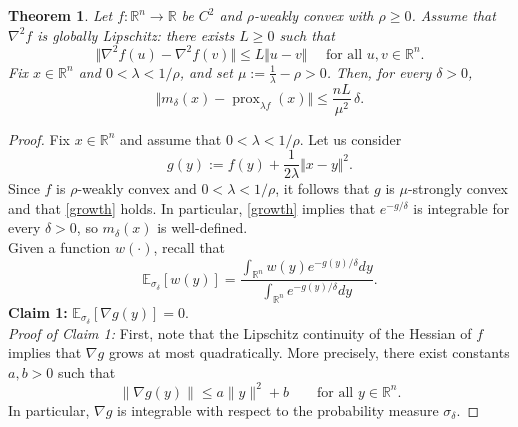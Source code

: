 \documentclass[11pt]{amsart}
\newcommand{\1}{\mathds{1}}
\newtheorem{theorem}{Theorem}[section]
\theoremstyle{definition}
\theoremstyle{remark}
\theoremstyle{definition}
\begin{document}
\begin{theorem}
Let $f\colon \mathbb{R}^n \to \mathbb{R}$ be $C^2$ and $\rho$-weakly convex with $\rho\geq 0$.  Assume that $\nabla^2 f$ is globally Lipschitz: there exists $L\geq 0$ such that
$$
\Vert \nabla^2 f(u)-\nabla^2 f(v)\Vert \leq L\Vert u-v\Vert \quad \textrm{ for all } u,v\in \mathbb{R}^n.
$$
Fix $x\in \mathbb{R}^n$ and $0<\lambda <1/\rho$, and set $\mu:=\frac{1}{\lambda}-\rho>0$. 
Then, for every $\delta>0$,
$$
\Vert m_{\delta}(x)-\operatorname{prox}_{\lambda f}(x)\Vert \leq \frac{nL}{\mu^2}\,\delta.
$$
\end{theorem}
\begin{proof} Fix $x\in \mathbb{R}^n$ and assume that $0<\lambda <1/\rho$. Let us consider 
\begin{equation*}
g(y):=f(y)+\frac{1}{2\lambda}\Vert x-y\Vert^2.
\end{equation*}
Since $f$ is $\rho$-weakly convex and $0<\lambda <1/\rho$, it follows that $g$ is $\mu$-strongly convex and that \eqref{growth} holds. In particular, \eqref{growth} implies that $e^{-g/\delta}$ is integrable for every $\delta>0$, so $m_{\delta}(x)$ is well-defined. \\
Given a function $w(\cdot)$, recall that
$$
\mathbb{E}_{\sigma_{\delta}}[w(y)]=\frac{\int_{\mathbb{R}^n} w(y)e^{-g(y)/\delta}dy}{\int_{\mathbb{R}^n}e^{-g(y)/\delta}dy}.
$$
\textbf{Claim 1:} $\mathbb{E}_{\sigma_{\delta}}[ \nabla g(y)]=0$.\\
\emph{Proof of Claim 1:} First, note that the Lipschitz continuity of the Hessian of $f$ implies that $\nabla g$ grows at most quadratically. More precisely, there exist constants $a,b>0$ such that
\[
\|\nabla g(y)\|\le a\|y\|^{2}+b \qquad \text{for all } y\in\mathbb{R}^{n}.
\]
In particular, $\nabla g$ is integrable with respect to the probability measure $\sigma_\delta$.



\end{proof}
\end{document}

